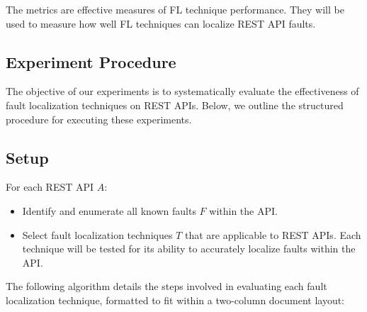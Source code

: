 \documentclass[conference]{IEEEtran}
\begin{document}
The metrics are effective measures of FL technique performance. They will be used to measure how well FL techniques can localize REST API faults.

\subsection{Experiment Procedure}
\label{sec:experiment-procedure}



The objective of our experiments is to systematically evaluate the effectiveness of fault localization techniques on REST APIs. Below, we outline the structured procedure for executing these experiments.

\subsection{Setup}
For each REST API \( A \):
\begin{itemize}
    \item Identify and enumerate all known faults \( F \) within the API.
    \item Select fault localization techniques \( T \) that are applicable to REST APIs. Each technique will be tested for its ability to accurately localize faults within the API.
\end{itemize}

The following algorithm details the steps involved in evaluating each fault localization technique, formatted to fit within a two-column document layout:
\end{document}
